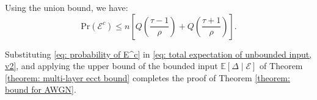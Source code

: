 \documentclass[lettersize,onecolumn]{IEEEtran}
\begin{document}
Using the union bound, we have:
\begin{equation}
    \mathrm{Pr}\left(\mathcal{E}^c\right) \leq n\left[ Q(\frac{\tau-1}{\rho}) + Q(\frac{\tau+1}{\rho}) \right].
    \label{eq: probability of E^c}
\end{equation}

Substituting \eqref{eq: probability of E^c} in \eqref{eq: total expectation of unbounded input, v2}, and applying the upper bound of the bounded input $\mathbb{E}\left[\Delta\mid \mathcal{E}\right]$ of Theorem \ref{theorem: multi-layer ecct bound} completes the proof of Theorem \ref{theorem: bound for AWGN}.



\end{document}
